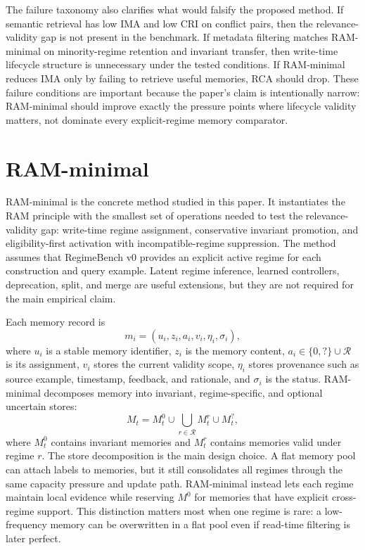 \documentclass{article} %
\begin{document}
The failure taxonomy also clarifies what would falsify the proposed method.
If semantic retrieval has low IMA and low CRI on conflict pairs, then the relevance-validity gap is not present in the benchmark.
If metadata filtering matches RAM-minimal on minority-regime retention and invariant transfer, then write-time lifecycle structure is unnecessary under the tested conditions.
If RAM-minimal reduces IMA only by failing to retrieve useful memories, RCA should drop.
These failure conditions are important because the paper's claim is intentionally narrow: RAM-minimal should improve exactly the pressure points where lifecycle validity matters, not dominate every explicit-regime memory comparator.

\section{RAM-minimal}
\label{sec:methodology}

RAM-minimal is the concrete method studied in this paper.
It instantiates the RAM principle with the smallest set of operations needed to test the relevance-validity gap: write-time regime assignment, conservative invariant promotion, and eligibility-first activation with incompatible-regime suppression.
The method assumes that RegimeBench v0 provides an explicit active regime for each construction and query example.
Latent regime inference, learned controllers, deprecation, split, and merge are useful extensions, but they are not required for the main empirical claim.

Each memory record is
\begin{equation}
    m_i = (u_i, z_i, a_i, v_i, \eta_i, \sigma_i),
\end{equation}
where $u_i$ is a stable memory identifier, $z_i$ is the memory content, $a_i \in \{0, ?\}\cup\mathcal{R}$ is its assignment, $v_i$ stores the current validity scope, $\eta_i$ stores provenance such as source example, timestamp, feedback, and rationale, and $\sigma_i$ is the status.
RAM-minimal decomposes memory into invariant, regime-specific, and optional uncertain stores:
\begin{equation}
    M_t = M_t^0 \cup \bigcup_{r \in \mathcal{R}} M_t^r \cup M_t^?,
\end{equation}
where $M_t^0$ contains invariant memories and $M_t^r$ contains memories valid under regime $r$.
The store decomposition is the main design choice.
A flat memory pool can attach labels to memories, but it still consolidates all regimes through the same capacity pressure and update path.
RAM-minimal instead lets each regime maintain local evidence while reserving $M^0$ for memories that have explicit cross-regime support.
This distinction matters most when one regime is rare: a low-frequency memory can be overwritten in a flat pool even if read-time filtering is later perfect.
\end{document}
